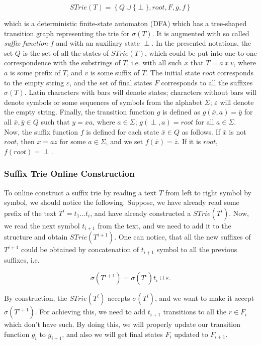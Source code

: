 \documentclass[paper=a4, fontsize=11pt]{scrartcl} %
\numberwithin{equation}{section} %
\numberwithin{figure}{section} %
\numberwithin{table}{section} %
\begin{document}
\begin{equation}
STrie(T) = \left\{Q \cup \{\perp\}, root, F, g, f \right\}
\end{equation}

which is a deterministic finite-state automaton (DFA) which has a tree-shaped transition graph representing the trie for $\sigma(T)$. It is augmented with so called \textit{suffix function} $f$ and with an auxiliary state $\perp$. In the presented notations, the set $Q$ is the set of all the states of $STrie(T)$, which could be put into one-to-one correspondence with the substrings of $T$, i.e. with all such $x$ that $T = a\ x\ v$, where $a$ is some prefix of $T$, and $v$ is some suffix of $T$. The initial state $root$ corresponds to the empty string $\varepsilon$, and the set of final states $F$ corresponds to all the suffixes $\sigma(T)$. Latin characters with bars will denote states; characters without bars will denote symbols or some sequences of symbols from the alphabet $\Sigma$; $\varepsilon$ will denote the empty string. Finally, the transition function $g$ is defined as $g(\bar{x}, a) = \bar{y}$ for all $\bar{x}, \bar{y} \in Q$ such that $y = xa$, where $a \in \Sigma$; $g(\perp, a) = root$ for all $a \in \Sigma$.\\

Now, the suffix function $f$ is defined for each state $\bar{x} \in Q$ as follows. If $\bar{x}$ is not $root$, then $x = az$ for some $a \in \Sigma$, and we set $f(\bar{x}) = \bar{z}$. If it is $root$, $f(root) = \perp$.

\subsubsection{Suffix Trie Online Construction}
To online construct a suffix trie by reading a text $T$ from left to right symbol by symbol, we should notice the following. Suppose, we have already read some prefix of the text $T^i = t_1 \dots t_i$, and have already constructed a $STrie(T^i)$. Now, we read the next symbol $t_{i+1}$ from the text, and we need to add it to the structure and obtain $STrie(T^{i+1})$. One can notice, that all the new suffixes of $T^{i+1}$ could be obtained by concatenation of $t_{i+1}$ symbol to all the previous suffixes, i.e.

$$
\sigma(T^{i+1}) = \sigma(T^i)t_i \cup \varepsilon.
$$

By construction, the $STrie(T^i)$ accepts $\sigma(T^i)$, and we want to make it accept $\sigma(T^{i+1})$. For achieving this, we need to add $t_{i+1}$ transitions to all the $r \in F_i$ which don't have such. By doing this, we will properly update our transition function $g_i$ to $g_{i+1}$, and also we will get final states $F_i$ updated to $F_{i+1}$.\\
\end{document}
